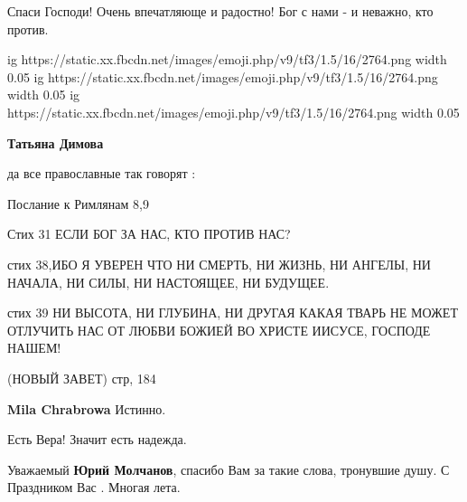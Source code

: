 \begin{itemize}
Спаси Господи! Очень впечатляюще и радостно! Бог с нами - и неважно, кто против.

\ifcmt
  ig https://static.xx.fbcdn.net/images/emoji.php/v9/tf3/1.5/16/2764.png
  width 0.05
  ig https://static.xx.fbcdn.net/images/emoji.php/v9/tf3/1.5/16/2764.png
  width 0.05
  ig https://static.xx.fbcdn.net/images/emoji.php/v9/tf3/1.5/16/2764.png
  width 0.05
\fi

\begin{itemize}
 
\textbf{Татьяна Димова} 

да все православные так говорят :

Послание к Римлянам 8,9

Стих 31 ЕСЛИ БОГ ЗА НАС, КТО ПРОТИВ НАС?

стих 38,ИБО Я УВЕРЕН ЧТО НИ СМЕРТЬ, НИ ЖИЗНЬ, НИ АНГЕЛЫ, НИ НАЧАЛА, НИ СИЛЫ, НИ
НАСТОЯЩЕЕ, НИ БУДУЩЕЕ.

стих 39 НИ ВЫСОТА, НИ ГЛУБИНА, НИ ДРУГАЯ КАКАЯ ТВАРЬ НЕ МОЖЕТ ОТЛУЧИТЬ НАС ОТ
ЛЮБВИ БОЖИЕЙ ВО ХРИСТЕ ИИСУСЕ, ГОСПОДЕ НАШЕМ! 🙏🙏🙏

(НОВЫЙ ЗАВЕТ) стр, 184


 
\textbf{Mila Chrabrowa} Истинно.🌷
\end{itemize}

 
Есть Вера! Значит есть надежда.

 
Уважаемый \textbf{Юрий Молчанов}, спасибо Вам за такие слова, тронувшие душу. С Праздником Вас . Многая лета.


\end{itemize}
